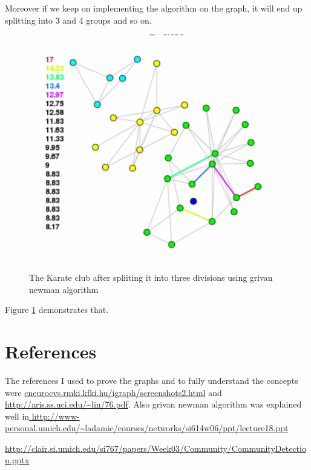 \documentclass{article}
\begin{document}
Moreover if we keep on implementing the algorithm on the graph, it will end up splitting into 3 and 4 groups and so on. 
\begin{figure}
\centering
\includegraphics[scale=0.75]{4.png}
\caption{The Karate club after spliiting it into three divisions using grivan newman algorithm}
\label{fig:4.png}
\end{figure}
Figure \ref{fig:4.png} demonstrates that.

\section{References}
The references I used to prove the graphs and to fully understand the concepts were \url{cneurocvs.rmki.kfki.hu/igraph/screenshots2.html} and \url{http://aris.ss.uci.edu/~lin/76.pdf}.
Also grivan newman algorithm was explained well in\url{ http://www-personal.umich.edu/~ladamic/courses/networks/si614w06/ppt/lecture18.ppt}

\url{http://clair.si.umich.edu/si767/papers/Week03/Community/CommunityDetection.pptx}
\end{document}
